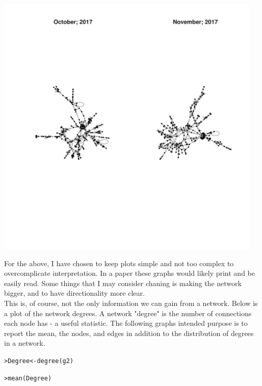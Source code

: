 \documentclass[12pt]{article}\usepackage[]{graphicx}\usepackage[]{color}
\makeatletter
\newcommand{\hlstd}[1]{\textcolor[rgb]{0.882,0.878,0.898}{#1}}%
\newcommand{\hlkwb}[1]{\textcolor[rgb]{0.902,0.675,0.196}{#1}}%
\newcommand{\hlkwd}[1]{\textcolor[rgb]{0.733,0.388,0.812}{#1}}%
\newenvironment{kframe}{%
 \def\at@end@of@kframe{}%
 \ifinner\ifhmode%
  \def\at@end@of@kframe{\end{minipage}}%
  \begin{minipage}{\columnwidth}%
 \fi\fi%
 \def\FrameCommand##1{\hskip\@totalleftmargin \hskip-\fboxsep
 \colorbox{shadecolor}{##1}\hskip-\fboxsep
     \hskip-\linewidth \hskip-\@totalleftmargin \hskip\columnwidth}%
 \MakeFramed {\advance\hsize-\width
   \@totalleftmargin\z@ \linewidth\hsize
   \@setminipage}}%
 {\par\unskip\endMakeFramed%
 \at@end@of@kframe}
\newenvironment{knitrout}{}{} %
\makeatother
\begin{document}
\begin{flushleft}
\begin{center}
\begin{knitrout}
\includegraphics[width=5in]{figure/plot2-1} 

\end{knitrout}
\end{center}

For the above, I have chosen to keep plots simple and not too complex to overcomplicate interpretation. In a paper these graphs would likely print and be easily read. Some things that I may consider chaning is making the network bigger, and to have directionality more clear.\\

This is, of course, not the only information we can gain from a network. Below is a plot of the network degrees. A network "degree" is the number of connections each node has - a useful statistic. The following graphs intended purpose is to report the mean, the nodes, and edges in addition to the distribution of degrees in a network.

\begin{center}
\begin{knitrout}
\color{fgcolor}\begin{kframe}
\begin{alltt}
\hlstd{> }\hlstd{Degree} \hlkwb{<-} \hlkwd{degree}\hlstd{(g2)}
\end{alltt}


{\ttfamily\noindent\bfseries\color{errorcolor}{\#\# Error in FUN(X[[i]], ...): as.edgelist.sna input must be an adjacency matrix/array, edgelist matrix, network, or sparse matrix, or list thereof.}}\begin{alltt}
\hlstd{> }\hlkwd{mean}\hlstd{(Degree)}
\end{alltt}



\end{kframe}
\end{knitrout}
\end{center}
\end{flushleft}
\end{document}
